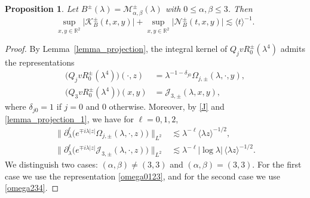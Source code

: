 \documentclass[reqno]{amsart}
\newtheorem{proposition}[theorem]{Proposition}
\numberwithin{equation}{section}
\begin{document}
\begin{proposition}\label{prop_K}
	Let $B^\pm(\lambda) =\mathcal{M}_{\alpha,\beta}^\pm(\lambda)$ with $0 \le \alpha, \beta \le 3$. Then
	\[
	\sup_{x,y\in\mathbb{R}^2} \bigl| \mathcal{K}_{B}^\pm(t,x,y) \bigr| +\sup_{x,y\in\mathbb{R}^2} \bigl| \mathcal{N}_{B}^\pm(t,x,y) \bigr| \lesssim \langle t\rangle^{-1}.
	\]
\end{proposition}

\begin{proof}
	By Lemma~\ref{lemma_projection}, the integral kernel of
\(Q_jvR_0^\pm(\lambda^4)\) admits the representations
	\begin{align}\label{omega0123}
		\bigl(Q_j v R_0^\pm(\lambda^4)\bigr)(\cdot,z)& = \lambda^{-1-\delta_{j 0}}\Omega_{j,\pm}(\lambda,\cdot,y),\\
		\label{omega234}	\bigl(Q_3 v R_0^\pm(\lambda^4)\bigr)(x,y)&=\mathcal{J}_{3, \pm} (\lambda,x,y),
	\end{align}
	where $\delta_{j 0}=1$ if $j=0$ and $0$ otherwise. Moreover, by \eqref{J} and \eqref{lemma_projection_1}, we have for $\ell=0,1,2,$
	\begin{align}
	\bigl\|\partial_\lambda^\ell \bigl(e^{\mp i\lambda|z|}\Omega_{j,\pm}(\lambda,\cdot,z)\bigr)\bigr\|_{L^2} &\lesssim \lambda^{-\ell} \langle \lambda z \rangle^{-1/2}, \label{est:Omega-0-1}\\
	\bigl\|\partial_\lambda^\ell \bigl(e^{\mp i\lambda|z|}\mathcal{J}_{3,\pm}(\lambda,\cdot,z)\bigr)\bigr\|_{L^2} &\lesssim \lambda^{-\ell} |\log\lambda| \, \langle \lambda z \rangle^{-1/2}. \label{est:J-0-1}
\end{align}
We distinguish two cases: $(\alpha,\beta) \neq (3,3)$ and $(\alpha,\beta) = (3,3)$. 
For the first case we use the representation \eqref{omega0123}, and for the second case we use \eqref{omega234}.
	
	


\end{proof}
\end{document}
